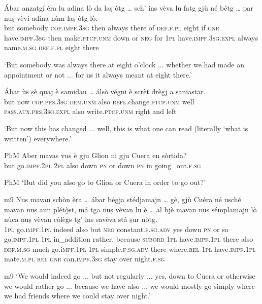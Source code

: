 \begin{linenumbers}
	\gll Ábar anzatgí èra lu adina lò da laṣ òtg … sch’ ins vèva lu fatg gjù né bétg … par nuṣ vèvi adina nùm laṣ òtg lò.   \\
	but somebody \textsc{cop.impf.3sg} then always there of \textsc{def.f.pl} eight {} if \textsc{gnr} have.\textsc{impf.3sg} then make.\textsc{ptcp.unm} down or \textsc{neg} {} for \textsc{1pl} have.\textsc{impf.3sg.expl} always name.\textsc{m.sg} \textsc{def.f.pl} eight there\\
\end{linenumbers}
\medskip
\glt `But somebody was always there at eight o'clock ... whether we had made an appointment or not ... for us it always meant at eight there.'
\medskip

\begin{linenumbers}
	\gll Ábar ùs ṣè quaj è samidau … álsò végni è scrèt drègj a saniastar.   \\
	but now \textsc{cop.prs.3sg} \textsc{dem.unm} also \textsc{refl}.change.\textsc{ptcp.unm} {} well \textsc{pass.aux.prs.3sg.expl} also write\textsc{.ptcp.unm} right and left\\
\end{linenumbers}
\medskip
\glt `But now this has changed ... well, this is what one can read (literally `what is written') everywhere.'
\medskip

\begin{linenumbers}
	\gll  {\ob}PhM{\cb} Aber mavas vus è gju Glion ni gju Cuera en sòrtida?  \\
	{} but go.\textsc{impf.2pl} \textsc{2pl} also down \textsc{pn} or down \textsc{pn} in going\_out.\textsc{f.sg}\\
\end{linenumbers}
\medskip
\glt {\ob}PhM{\cb} `But did you also go to Glion or Cuera in order to go out?'
\medskip

\begin{linenumbers}
	\gll {\ob}m9{\cb} Nus mavan schòn èra … ábar bégja stédjamajn … gè, gjù Cuéra né usché mavan nuṣ aun plétò̱st, má tga nuṣ vèvan lu è … al bjè mavan nus sémplamajn lò nùca nuṣ vèvan còlègs tg’ ins savèva stá ṣur nòtg.   \\
{} \textsc{1pl} go.\textsc{impf.1pl} indeed also {} but \textsc{neg} constant.\textsc{f.sg.adv} {} yes down \textsc{pn} or so go.\textsc{impf.1pl} \textsc{1pl} in\_addition rather, because \textsc{subord} \textsc{1pl} have.\textsc{impf.1pl} there also {} \textsc{def.m.sg} much go.i\textsc{mpf.1pl} \textsc{1pl} simple.\textsc{f.sg.adv} there where.\textsc{rel} \textsc{1pl} have.\textsc{impf.1pl} mate.\textsc{m.pl} \textsc{rel} \textsc{gnr} can.\textsc{impf.3sg} stay over night.\textsc{f.sg}	\\
\end{linenumbers}
\medskip
\glt {\ob}m9{\cb} `We would indeed go ... but not regularly ... yes, down to Cuera or otherwise we would rather go ... because we have also ... we would mostly go simply where we had friends where we could stay over night.'
\medskip

